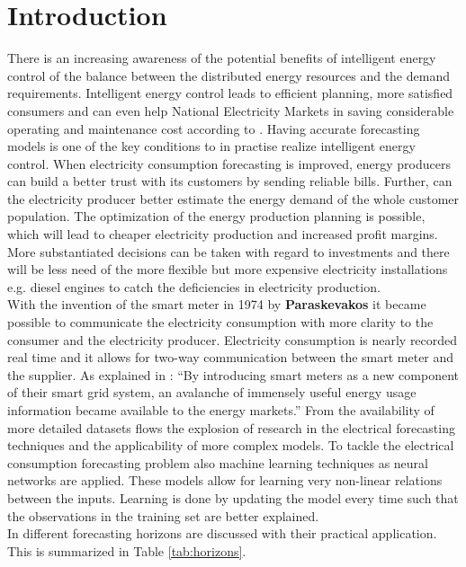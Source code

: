 \chapter{Introduction}

There is an increasing awareness of the potential benefits of intelligent energy control of the balance between the distributed energy resources and the demand requirements. Intelligent energy control leads to efficient planning, more satisfied consumers and can even help National Electricity Markets in saving considerable operating and maintenance cost according to \cite{NarjesFallah2018}. Having accurate forecasting models is one of the key conditions to in practise realize intelligent energy control. When electricity consumption forecasting is improved, energy producers can build a better trust with its customers by sending reliable bills. Further, can the electricity producer better estimate the energy demand of the whole customer population. The optimization of the energy production planning is possible, which will lead to cheaper electricity production and increased profit margins. More substantiated decisions can be taken with regard to investments and there will be less need of the more flexible but more expensive electricity installations e.g. diesel engines to catch the deficiencies in electricity production.\\

With the invention of the smart meter in 1974 by \textbf{Paraskevakos} it became possible to communicate the electricity consumption with more clarity to the consumer and the electricity producer. Electricity consumption is nearly recorded real time and it allows for two-way communication between the smart meter and the supplier. As explained in \cite{Depuru2011}: ``By introducing smart meters as a new
component of their smart grid system, an avalanche of immensely useful energy usage information
became available to the energy markets.'' From the availability of more detailed datasets flows the explosion of research in the electrical forecasting techniques and the applicability of more complex models. To tackle the electrical consumption forecasting problem also machine learning techniques as neural networks are applied. These models allow for learning very non-linear relations between the inputs. Learning is done by updating the model every time such that the observations in the training set are better explained.\\

In \cite{NarjesFallah2018} different forecasting horizons are discussed with their practical application. This is summarized in Table \ref{tab:horizons}.


